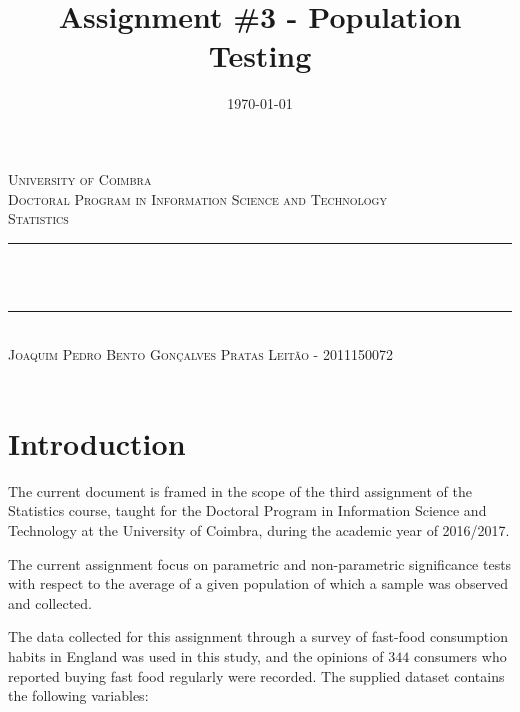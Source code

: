 \documentclass[12pt]{article}
\title{Assignment \#3 - Population Testing}
\date{\today}
\makeatletter
\let\thetitle\@title
\let\thedate\@date
\makeatother
\begin{document}

\begin{titlepage}
	\centering
    \textsc{\LARGE University of Coimbra}\\[1.0 cm]
	\textsc{\large Doctoral Program in Information Science and Technology}\\[0.5 cm]
    \textsc{\large Statistics}\\[5 cm]
	\rule{\linewidth}{0.2 mm} \\[0.4 cm]
	{ \LARGE \bfseries \thetitle}\\ [0.2 cm]
    \rule{\linewidth}{0.2 mm} \\[3 cm]
    
    \textsc{Joaquim Pedro Bento Gonçalves Pratas Leitão - 2011150072}\\[5 cm]
	
	{\large \thedate}\\[2 cm]
 
	\vfill
	
\end{titlepage}


\section{Introduction}
\label{introduction}

The current document is framed in the scope of the third assignment of the Statistics course, taught for the Doctoral Program in Information Science and Technology at the University of Coimbra, during the academic year of 2016/2017.

The current assignment focus on parametric and non-parametric significance tests with respect to the average of a given population of which a sample was observed and collected.

The data collected for this assignment through a survey of fast-food consumption habits in England was used in this study, and the opinions of $344$ consumers who reported buying fast food regularly were recorded. The supplied dataset contains the following variables:
\end{document}
